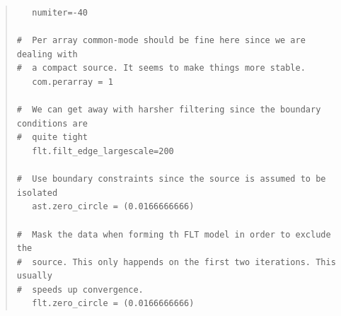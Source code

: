 \documentclass[twoside,11pt]{article}
\renewcommand{\_}{\texttt{\symbol{95}}}
\newenvironment{myquote}{\begin{quote}\begin{small}}{\end{small}\end{quote}}
\begin{document}
\begin{myquote}
\begin{verbatim}
   numiter=-40

#  Per array common-mode should be fine here since we are dealing with
#  a compact source. It seems to make things more stable.
   com.perarray = 1

#  We can get away with harsher filtering since the boundary conditions are
#  quite tight
   flt.filt_edge_largescale=200

#  Use boundary constraints since the source is assumed to be isolated
   ast.zero_circle = (0.0166666666)

#  Mask the data when forming th FLT model in order to exclude the
#  source. This only happends on the first two iterations. This usually
#  speeds up convergence.
   flt.zero_circle = (0.0166666666)
\end{verbatim}
\end{myquote}
\end{document}
